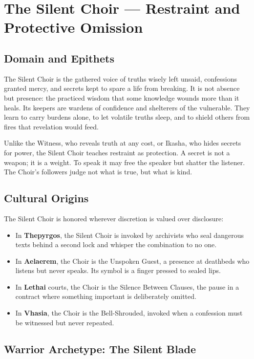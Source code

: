 \section{The Silent Choir — Restraint and Protective Omission}

\subsection{Domain and Epithets}

The Silent Choir is the gathered voice of truths wisely left unsaid, confessions granted mercy, and secrets kept to spare a life from breaking. It is not absence but presence: the practiced wisdom that some knowledge wounds more than it heals. Its keepers are wardens of confidence and shelterers of the vulnerable. They learn to carry burdens alone, to let volatile truths sleep, and to shield others from fires that revelation would feed.

Unlike the Witness, who reveals truth at any cost, or Ikasha, who hides secrets for power, the Silent Choir teaches restraint as protection. A secret is not a weapon; it is a weight. To speak it may free the speaker but shatter the listener. The Choir's followers judge not what is true, but what is kind.

\subsection{Cultural Origins}

The Silent Choir is honored wherever discretion is valued over disclosure:

\begin{itemize}
\item In \textbf{Thepyrgos}, the Silent Choir is invoked by archivists who seal dangerous texts behind a second lock and whisper the combination to no one.
\item In \textbf{Aelaerem}, the Choir is the Unspoken Guest, a presence at deathbeds who listens but never speaks. Its symbol is a finger pressed to sealed lips.
\item In \textbf{Lethai} courts, the Choir is the Silence Between Clauses, the pause in a contract where something important is deliberately omitted.
\item In \textbf{Vhasia}, the Choir is the Bell-Shrouded, invoked when a confession must be witnessed but never repeated.
\end{itemize}

\subsection{Warrior Archetype: The Silent Blade}

